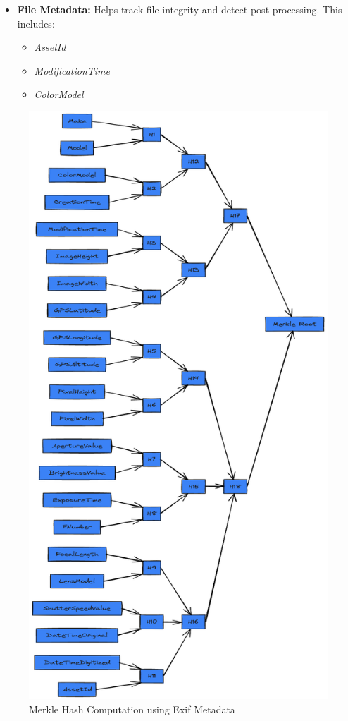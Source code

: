 \begin{itemize}
    \item {\textbf{File Metadata:}} Helps track file integrity and detect post-processing. This includes:
    \begin{itemize}
        \item \textit{AssetId}
        \item \textit{ModificationTime}
        \item \textit{ColorModel}
    \end{itemize}
\end{itemize}

\begin{figure}[ht!]
    \centering
    \includegraphics[scale=0.245]{./images/merkleHashComputation.png}
    \caption{Merkle Hash Computation using Exif Metadata}
\end{figure}

